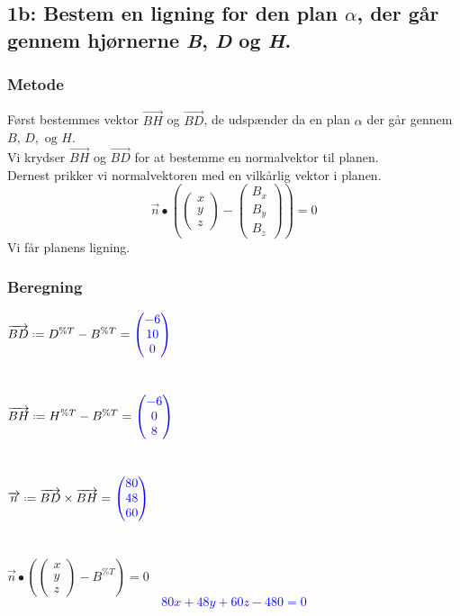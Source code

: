 \documentclass[../main.tex]{subfiles}
\begin{document}
\subsection*{1b: Bestem en ligning for den plan \(\alpha\), der går gennem hjørnerne \textit{B}, \textit{D} og \textit{H}. }
    \subsubsection*{Metode}
        Først bestemmes vektor \(\overrightarrow{BH}\) og \(\overrightarrow{BD}\), de udspænder da en plan \(\alpha\) der går gennem \(B,\, D,\text{ og } H\).\\
        Vi krydser \(\overrightarrow{BH}\) og \(\overrightarrow{BD}\) for at bestemme en normalvektor til planen.\\
        Dernest prikker vi normalvektoren med en vilkårlig vektor i planen.
        \[\overrightarrow{n}\bullet \left(\begin{pmatrix} x \\ y \\ z \end{pmatrix}-\begin{pmatrix}B_x \\B_y\\B_z \end{pmatrix}\right)=0\]
        Vi får planens ligning.
    \subsubsection*{Beregning}
        \(\overrightarrow{BD} \defeq D^{\%T}-B^{\%T} = \textcolor{blue}{\begin{pmatrix} -6 \\ 10 \\ 0\end{pmatrix}}\)\\\\\\
        \(\overrightarrow{BH} \defeq H^{\%T}-B^{\%T} = \textcolor{blue}{\begin{pmatrix} -6 \\ 0 \\ 8\end{pmatrix}}\)\\\\\\
        \(\overrightarrow{n} \defeq \overrightarrow{BD} \times \overrightarrow{BH} = \textcolor{blue}{\begin{pmatrix} 80 \\ 48 \\ 60\end{pmatrix}}\)\\\\\\
        \(\overrightarrow{n} \bullet \left(\begin{pmatrix} x \\ y\\ z\end{pmatrix} - B^{\%T}\right)=0\)
        \textcolor{blue}{\[80x+48y+60z-480=0\]}
\end{document}

